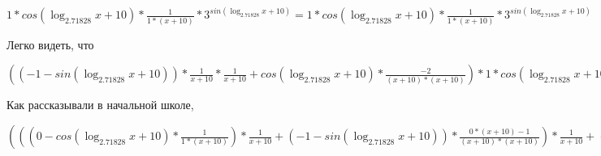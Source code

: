 \documentclass[12pt,a4paper,fleqn]{article}
\theoremstyle{definition}
\begin{document}
$ 1  * cos(\log_{ 2.71828 }{ x  +  10 }) * \frac{ 1 }{ 1  * ( x  +  10 )}
 * { 3 }^{sin(\log_{ 2.71828 }{ x  +  10 })} =  1  * cos(\log_{ 2.71828 }{ x  +  10 }) * \frac{ 1 }{ 1  * ( x  +  10 )}
 * { 3 }^{sin(\log_{ 2.71828 }{ x  +  10 })}$

Легко видеть, что 

$(( -1  - sin(\log_{ 2.71828 }{ x  +  10 })) * \frac{ 1 }{ x  +  10 }
 * \frac{ 1 }{ x  +  10 }
 + cos(\log_{ 2.71828 }{ x  +  10 }) * \frac{ -2 }{( x  +  10 ) * ( x  +  10 )}
) *  1  * cos(\log_{ 2.71828 }{ x  +  10 }) * \frac{ 1 }{ 1  * ( x  +  10 )}
 * { 3 }^{sin(\log_{ 2.71828 }{ x  +  10 })} = (( -1  - sin(\log_{ 2.71828 }{ x  +  10 })) * \frac{ 1 }{ x  +  10 }
 * \frac{ 1 }{ x  +  10 }
 + cos(\log_{ 2.71828 }{ x  +  10 }) * \frac{ -2 }{( x  +  10 ) * ( x  +  10 )}
) *  1  * cos(\log_{ 2.71828 }{ x  +  10 }) * \frac{ 1 }{ 1  * ( x  +  10 )}
 * { 3 }^{sin(\log_{ 2.71828 }{ x  +  10 })}$

Как рассказывали в начальной школе, 

$((( 0  - cos(\log_{ 2.71828 }{ x  +  10 }) * \frac{ 1 }{ 1  * ( x  +  10 )}
) * \frac{ 1 }{ x  +  10 }
 + ( -1  - sin(\log_{ 2.71828 }{ x  +  10 })) * \frac{ 0  * ( x  +  10 ) -  1 }{( x  +  10 ) * ( x  +  10 )}
) * \frac{ 1 }{ x  +  10 }
 + ( -1  - sin(\log_{ 2.71828 }{ x  +  10 })) * \frac{ 1 }{ x  +  10 }
 * \frac{ 0  * ( x  +  10 ) -  1 }{( x  +  10 ) * ( x  +  10 )}
 + ( -1  - sin(\log_{ 2.71828 }{ x  +  10 })) * \frac{ 1 }{ 1  * ( x  +  10 )}
 * \frac{ -2 }{( x  +  10 ) * ( x  +  10 )}
 + cos(\log_{ 2.71828 }{ x  +  10 }) * \frac{ 0  * ( x  +  10 ) * ( x  +  10 ) -  -2  * ( 1  * ( x  +  10 ) + ( x  +  10 ) *  1 )}{( x  +  10 ) * ( x  +  10 ) * ( x  +  10 ) * ( x  +  10 )}
) * { 3 }^{sin(\log_{ 2.71828 }{ x  +  10 })} + (( -1  - sin(\log_{ 2.71828 }{ x  +  10 })) * \frac{ 1 }{ x  +  10 }
 * \frac{ 1 }{ x  +  10 }
 + cos(\log_{ 2.71828 }{ x  +  10 }) * \frac{ -2 }{( x  +  10 ) * ( x  +  10 )}
) *  1  * cos(\log_{ 2.71828 }{ x  +  10 }) * \frac{ 1 }{ 1  * ( x  +  10 )}
 * { 3 }^{sin(\log_{ 2.71828 }{ x  +  10 })} = ((( 0  - cos(\log_{ 2.71828 }{ x  +  10 }) * \frac{ 1 }{ 1  * ( x  +  10 )}
) * \frac{ 1 }{ x  +  10 }
 + ( -1  - sin(\log_{ 2.71828 }{ x  +  10 })) * \frac{ 0  * ( x  +  10 ) -  1 }{( x  +  10 ) * ( x  +  10 )}
) * \frac{ 1 }{ x  +  10 }
 + ( -1  - sin(\log_{ 2.71828 }{ x  +  10 })) * \frac{ 1 }{ x  +  10 }
 * \frac{ 0  * ( x  +  10 ) -  1 }{( x  +  10 ) * ( x  +  10 )}
 + ( -1  - sin(\log_{ 2.71828 }{ x  +  10 })) * \frac{ 1 }{ 1  * ( x  +  10 )}
 * \frac{ -2 }{( x  +  10 ) * ( x  +  10 )}
 + cos(\log_{ 2.71828 }{ x  +  10 }) * \frac{ 0  * ( x  +  10 ) * ( x  +  10 ) -  -2  * ( 1  * ( x  +  10 ) + ( x  +  10 ) *  1 )}{( x  +  10 ) * ( x  +  10 ) * ( x  +  10 ) * ( x  +  10 )}
) * { 3 }^{sin(\log_{ 2.71828 }{ x  +  10 })} + (( -1  - sin(\log_{ 2.71828 }{ x  +  10 })) * \frac{ 1 }{ x  +  10 }
 * \frac{ 1 }{ x  +  10 }
 + cos(\log_{ 2.71828 }{ x  +  10 }) * \frac{ -2 }{( x  +  10 ) * ( x  +  10 )}
) *  1  * cos(\log_{ 2.71828 }{ x  +  10 }) * \frac{ 1 }{ 1  * ( x  +  10 )}
 * { 3 }^{sin(\log_{ 2.71828 }{ x  +  10 })}$
\end{document}
